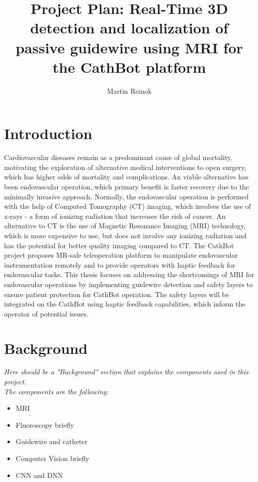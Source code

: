 \documentclass{article}
\title{Project Plan: Real-Time 3D detection and localization of passive guidewire using MRI for the CathBot platform }
\author{Martin Reinok}
\begin{document}
\maketitle

\tableofcontents
\newpage

\section{Introduction}
Cardiovascular diseases remain as a predominant cause of global mortality, motivating the exploration of alternative medical interventions to open surgery, which has higher odds of mortality and complications. An viable alternative has been endovascular operation, which primary benefit is faster recovery due to the minimally invasive approach. Normally, the endovascular operation is performed with the help of Computed Tomography (CT) imaging, which involves the use of x-rays - a form of ionizing radiation that increases the risk of cancer. An alternative to CT is the use of Magnetic Resonance Imaging (MRI) technology, which is more expensive to use, but does not involve any ionizing radiation and has the potential for better quality imaging compared to CT. The CathBot project \cite{cathbot} proposes MR-safe teleoperation platform to manipulate endovascular instrumentation remotely and to provide operators with haptic feedback for endovascular tasks. This thesis focuses on addressing the shortcomings of MRI for endovascular operations by implementing guidewire detection and safety layers to ensure patient protection for CathBot operation. The safety layers will be integrated on the CathBot using haptic feedback capabilities, which inform the operator of potential issues.

\section{Background}
\textit{Here should be a "Background" section that explains the components used in this project. 
\\ The components are the following:}
\begin{itemize}
    \item MRI
    \item Fluoroscopy briefly
    \item Guidewire and catheter
    \item Computer Vision briefly
    \item CNN and DNN
\end{itemize}
\end{document}
